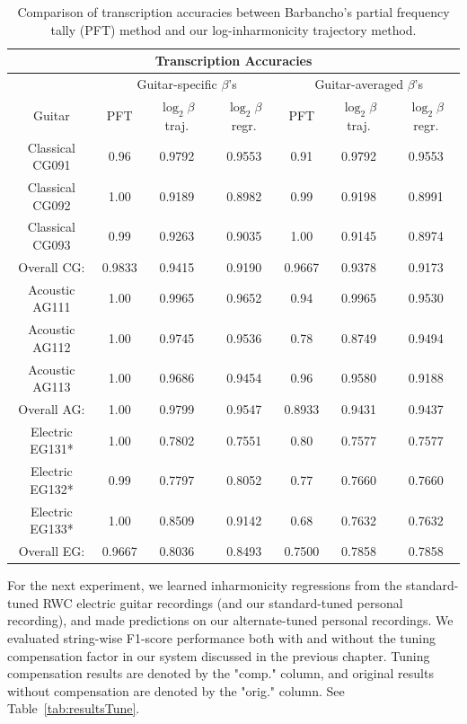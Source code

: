 \documentclass[12pt]{cmuthesis}
\begin{document}
\begin{table}
\begin{center}
\begin{tabular} {||c||c|c|c||c|c|c||}
\hline
\multicolumn{7}{|c|}{\bf{Transcription Accuracies}} \\
\hline
 & \multicolumn{3}{|c|}{Guitar-specific $\beta$'s} & \multicolumn{3}{|c|}{Guitar-averaged $\beta$'s}\\
\hline
Guitar & PFT & $\log_{2}\beta$ traj. & $\log_{2}\beta$ regr. & PFT & $\log_{2}\beta$ traj. & $\log_{2}\beta$ regr.\\
\hline
Classical CG091 & 0.96 & 0.9792 & 0.9553 & 0.91 & 0.9792 & 0.9553\\
\hline
Classical CG092 & 1.00 & 0.9189 & 0.8982 & 0.99 & 0.9198 &  0.8991\\
\hline
Classical CG093 & 0.99 & 0.9263 & 0.9035 & 1.00 & 0.9145 & 0.8974\\
\hline
Overall CG: & 0.9833 & 0.9415 & 0.9190 & 0.9667 & 0.9378 & 0.9173\\
\hline
\hline
Acoustic AG111 & 1.00 & 0.9965 & 0.9652 & 0.94 & 0.9965 & 0.9530 \\
\hline
Acoustic AG112 & 1.00 & 0.9745 & 0.9536 & 0.78 & 0.8749 & 0.9494 \\
\hline
Acoustic AG113  & 1.00 & 0.9686 & 0.9454 & 0.96 & 0.9580 & 0.9188\\
\hline
Overall AG: & 1.00 & 0.9799 & 0.9547 & 0.8933 & 0.9431 & 0.9437 \\
\hline
\hline
Electric EG131* & 1.00 & 0.7802 & 0.7551 & 0.80 & 0.7577 & 0.7577 \\
\hline
Electric EG132* & 0.99 & 0.7797 & 0.8052 & 0.77 & 0.7660 & 0.7660 \\
\hline
Electric EG133* & 1.00 & 0.8509 & 0.9142 & 0.68 & 0.7632  & 0.7632 \\
\hline
Overall EG: & 0.9667 & 0.8036 & 0.8493 & 0.7500 & 0.7858 & 0.7858\\
\hline
\end{tabular}
\caption{Comparison of transcription accuracies between Barbancho's partial frequency tally (PFT) method and our log-inharmonicity trajectory method.}
\label{tab:overall-results-RWC}
\end{center}
\end{table}


For the next experiment, we learned inharmonicity regressions from the standard-tuned RWC electric guitar recordings (and our standard-tuned personal recording), and made predictions on our alternate-tuned personal recordings. We evaluated string-wise F1-score performance both with and without the tuning compensation factor in our system discussed in the previous chapter. Tuning compensation results are denoted by the "comp." column, and original results without compensation are denoted by the "orig." column. See Table~\ref{tab:resultsTune}.
\end{document}
